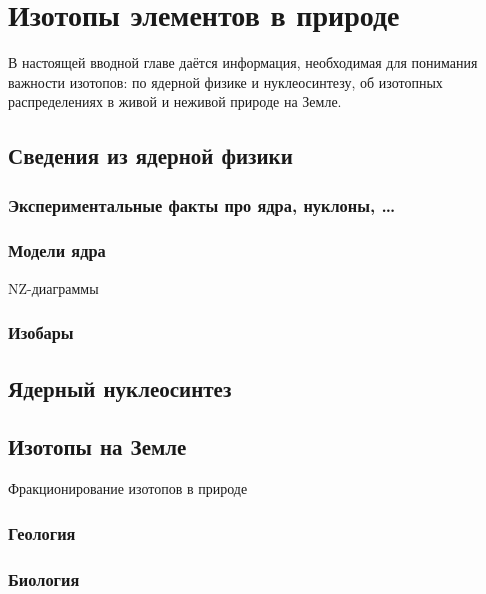 \documentclass[a5paper,openany]{book}
\begin{document}
			
			\chapter{Изотопы элементов в природе}
			
			
			
			В настоящей вводной главе даётся информация, необходимая для понимания важности изотопов:
			по ядерной физике и нуклеосинтезу, об изотопных распределениях в живой и неживой природе на Земле.
			
			
			\section{Сведения из ядерной физики}
			
			\subsection{Экспериментальные факты про ядра, нуклоны, \ldots}
			
			\subsection{Модели ядра}
			{NZ-диаграммы}
			\subsection{Изобары}
			
			
			
			
			\section{Ядерный нуклеосинтез}
			
			\section{Изотопы на Земле}
			
			Фракционирование изотопов в природе
			
			\subsection{Геология}
			\subsection{Биология}
			
			
			
\end{document}
